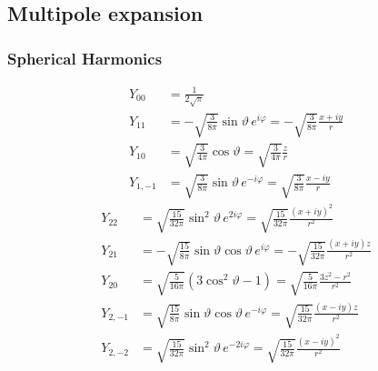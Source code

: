 \documentclass[../main.tex]{subfiles}
\begin{document}
\subsection{Multipole expansion}
\subsubsection{Spherical Harmonics}
\begin{align}
Y_{00}&=\frac{1}{2\sqrt{\pi}}\\
Y_{11}&=-\sqrt{\frac{3}{8\pi}}\sin\vartheta\,e^{i\varphi}=-\sqrt{\frac{3}{8\pi}}\frac{x+iy}{r}\\
Y_{10}&=\sqrt{\frac{3}{4\pi}}\cos\vartheta=\sqrt{\frac{3}{4\pi}}\frac{z}{r}\\
Y_{1,-1}&=\sqrt{\frac{3}{8\pi}}\sin\vartheta\,e^{-i\varphi}=\sqrt{\frac{3}{8\pi}}\frac{x-iy}{r}
\end{align}
\begin{align}
Y_{22}&=\sqrt{\frac{15}{32\pi}}\sin^2\vartheta\,e^{2i\varphi}
=\sqrt{\frac{15}{32\pi}}\frac{(x+iy)^2}{r^2}\\
Y_{21}&=-\sqrt{\frac{15}{8\pi}}\sin\vartheta\cos\vartheta\,e^{i\varphi}
=-\sqrt{\frac{15}{32\pi}}\frac{(x+iy)z}{r^2}\\
Y_{20}&=\sqrt{\frac{5}{16\pi}}(3\cos^2\vartheta-1)
=\sqrt{\frac{5}{16\pi}}\frac{3z^2-r^2}{r^2}\\
Y_{2,-1}&=\sqrt{\frac{15}{8\pi}}\sin\vartheta\cos\vartheta\,e^{-i\varphi}
=\sqrt{\frac{15}{32\pi}}\frac{(x-iy)z}{r^2}\\
Y_{2,-2}&=\sqrt{\frac{15}{32\pi}}\sin^2\vartheta\,e^{-2i\varphi}
=\sqrt{\frac{15}{32\pi}}\frac{(x-iy)^2}{r^2}
\end{align}
\end{document}
